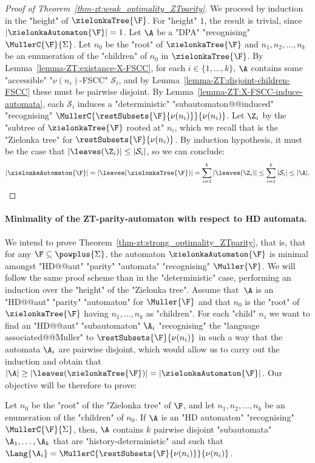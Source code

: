 \documentclass[10pt,a4paper]{amsart}
\renewcommand{\S}{\mathcal{S}}
\renewcommand{\SS}{\Sigma}
\begin{document}
\begin{proof}[Proof of Theorem~\ref{thm-zt:weak_optimality_ZTparity}]
	We proceed by induction in the "height" of $\zielonkaTree{\F}$. For "height" $1$, the result is trivial, since $|\zielonkaAutomaton{\F}| = 1$.
	Let $\A$ be a "DPA" "recognising" $\MullerC{\F}{\SS}$. Let $n_0$ be the "root" of $\zielonkaTree{\F}$ and $n_1, n_2, \dots, n_k$ be an enumeration of the "children" of $n_0$ in $\zielonkaTree{\F}$.
	By Lemma~\ref{lemma-ZT:existance-X-FSCC}, for each $i\in \{1, \dots, k\}$, $\A$ contains some "accessible" "$\nu(n_i)$-FSCC" $\S_i$, and by Lemma~\ref{lemma-ZT:disjoint-children-FSCC} these must be pairwise disjoint. By Lemma~\ref{lemma-ZT:X-FSCC-induce-automata}, each $\S_i$ induces a "deterministic" "subautomaton@@induced" "recognising" $\MullerC{\restSubsets{\F}{\nu(n_i)}}{\nu(n_i)}$. Let $\Z_i$ by the "subtree of $\zielonkaTree{\F}$ rooted at" $n_i$, which we recall that is the "Zielonka tree" for $\restSubsets{\F}{\nu(n_i)}$. By induction hypothesis, it must be the case that $|\leaves(\Z_i)| \leq |\S_i|$, so we can conclude:	
	\[ |\zielonkaAutomaton{\F}| = |\leaves(\zielonkaTree{\F})| = \sum\limits_{i=1}^k |\leaves(\Z_i)| \leq  \sum\limits_{i=1}^k |\S_i| \leq |\A|.\qedhere\]
\end{proof}


\paragraph*{Minimality of the ZT-parity-automaton with respect to HD automata.}
We intend to prove Theorem~\ref{thm-zt:strong_optimality_ZTparity}, that is, that for any $\F\subseteq \powplus{\SS}$, the automaton $\zielonkaAutomaton{\F}$ is minimal amongst "HD@@aut" "parity" "automata" "recognising" $\Muller{\F}$. 
We will follow the same proof scheme than in the "deterministic" case, performing an induction over the "height" of the "Zielonka tree". Assume that~$\A$ is an "HD@@aut" "parity" "automaton" for $\Muller{\F}$ and that $n_0$ is the "root" of $\zielonkaTree{\F}$ having $n_1, \dots, n_k$ as "children". For each "child" $n_i$ we want to find an "HD@@aut" "subautomaton" $\A_i$ "recognising" the "language associated@@Muller" to $\restSubsets{\F}{\nu(n_i)}$ in such a way that the automata $\A_i$ are pairwise disjoint, which would allow us to carry out the induction and obtain that $|\A| \geq |\leaves(\zielonkaTree{\F})| = |\zielonkaAutomaton{\F}|$. Our objective will be therefore to prove:

\begin{proposition}\label{prop-ZT:existance-disjoint-subautomata}
	Let $n_0$ be the "root" of the "Zielonka tree" of $\F$, and let $n_1, n_2, \dots, n_k$ be an enumeration of the "children" of $n_0$. If $\A$ is an "HD automaton" "recognising" $\MullerC{\F}{\SS}$, then, $\A$ contains $k$ pairwise disjoint "subautomata" $\A_1, \dots, \A_k$ that are "history-deterministic" and such that $\Lang{\A_i} = \MullerC{\restSubsets{\F}{\nu(n_i)}}{\nu(n_i)}$.
\end{proposition}
\end{document}
